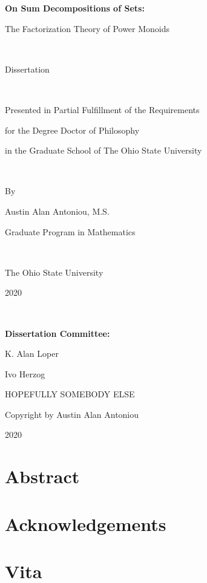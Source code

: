 \documentclass[10pt]{book}
\begin{document}
\frontmatter

\begin{titlepage}
\begin{center}
	{\LARGE \bf On Sum Decompositions of Sets: \\ \vspace{3mm}
		
		The Factorization Theory of Power Monoids}

\

	Dissertation

\
	
	Presented in Partial Fulfillment of the Requirements 
	
	for the Degree Doctor of Philosophy 
	
	in the Graduate School of The Ohio State University

\
		
	By 
	
	{\large Austin Alan Antoniou, M.S. 
	
	Graduate Program in Mathematics}

\
	
	The Ohio State University
	
	2020

\

	{\large {\bf Dissertation Committee:}
	
	K. Alan Loper
	
	Ivo Herzog
	
	HOPEFULLY SOMEBODY ELSE}
\end{center}

\end{titlepage}
\hspace{0pt}
\vfill
\begin{center}
{\Large Copyright by Austin Alan Antoniou

2020}
\end{center}
\vfill
\pagestyle{empty}
\chapter*{Abstract}

\chapter*{Acknowledgements}

\chapter*{Vita}


\tableofcontents


\mainmatter











%

\newpage
\nocite{*}


\end{document}
